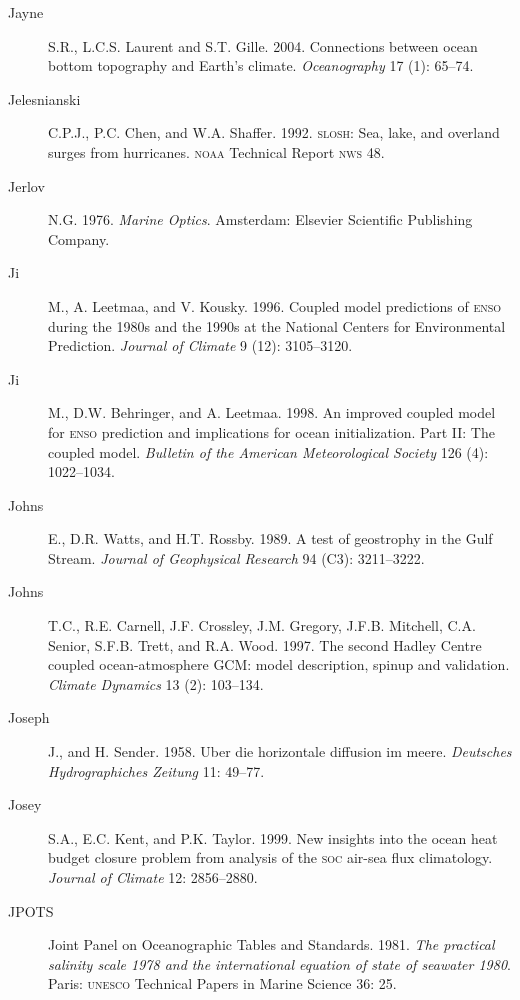 \begin{description}
\item [Jayne]S.R., L.C.S. Laurent and S.T. Gille. 2004. Connections between ocean bottom topography and Earth's climate. \textit{Oceanography} 17 (1): 65--74.

\item [Jelesnianski]C.P.J., P.C. Chen, and W.A. Shaffer. 1992. \textsc{slosh}: Sea, lake, and overland surges from hurricanes. \textsc{noaa} Technical Report \textsc{nws} 48.

\item[Jerlov]N.G. 1976. \textit{Marine Optics}. Amsterdam: Elsevier Scientific
Publishing Company.

\item[Ji]M., A. Leetmaa, and V. Kousky. 1996. Coupled model predictions of \textsc{enso} during the 1980s and the 1990s at the National Centers for Environmental Prediction. \textit{Journal of Climate} 9 (12): 3105--3120.

\item[Ji]M., D.W. Behringer, and A. Leetmaa. 1998. An improved coupled model for \textsc{enso} prediction and implications for ocean initialization. Part II: The coupled model. \textit{Bulletin of the American Meteorological Society} 126 (4): 1022--1034.

\item [Johns]E., D.R. Watts, and H.T. Rossby. 1989. A test of geostrophy in the
Gulf Stream. \textit{Journal of Geophysical Research} 94 (C3): 3211--3222.

\item [Johns]T.C., R.E. Carnell, J.F. Crossley, J.M. Gregory, J.F.B. Mitchell,
C.A. Senior, S.F.B. Trett, and R.A. Wood. 1997. The second Hadley Centre coupled
ocean-atmosphere GCM: model description, spinup and validation. \textit{Climate
Dynamics} 13 (2): 103--134.

\item[Joseph]J., and H. Sender. 1958. Uber die horizontale diffusion im meere.
\textit{Deutsches Hydrographiches Zeitung} 11: 49--77.

\item [Josey]S.A., E.C. Kent, and P.K. Taylor. 1999. New insights into the ocean heat budget closure problem from analysis of the \textsc{soc} air-sea flux climatology. \textit{Journal of Climate} 12: 2856--2880.
	
\item [JPOTS]Joint Panel on Oceanographic Tables and Standards. 1981. \textit{The practical salinity scale 1978 and the international equation of state of seawater 1980}. Paris: \textsc{unesco} Technical Papers in Marine Science 36: 25.
	

\end{description}
